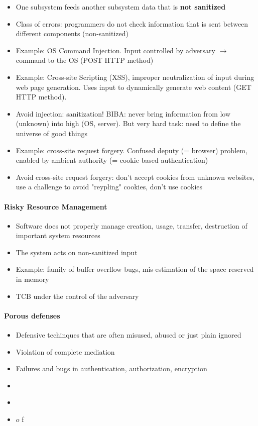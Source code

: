 \documentclass{article}
\newenvironment{myitemize}
{ \begin{itemize}
    \setlength{\itemsep}{005pt}
    \setlength{\parskip}{0pt}
    \setlength{\parsep}{0pt}     }
{ \end{itemize}                  }
\begin{document}
\begin{multicols}{2}
\begin{myitemize}
    \item One subsystem feeds another subsystem data that is \textbf{not sanitized}
    \item Class of errors: programmers do not check information that is sent between different components (non-sanitized)
    \item Example: OS Command Injection. Input controlled by adversary $\rightarrow$ command to the OS (POST HTTP method) 
    \item Example: Cross-site Scripting (XSS), improper neutralization of input during web page generation. Uses input to dynamically generate web content (GET HTTP method). 
    \item Avoid injection: sanitization! BIBA: never bring information from low (unknown) into high (OS, server). But very hard task: need to define the universe of good things
    \item Example: cross-site request forgery. Confused deputy (= browser) problem, enabled by ambient authority (= cookie-based authentication) 
    \item Avoid cross-site request forgery: don't accept cookies from unknown websites, use a challenge to avoid "reypling" cookies, don't use cookies
\end{myitemize}

\paragraph{Risky Resource Management}

\begin{myitemize}
    \item Software does not properly manage creation, usage, transfer, destruction of important system resources
    \item The system acts on non-sanitized input
    \item Example: family of buffer overflow bugs, mis-estimation of the space reserved in memory 
    \item TCB under the control of the adversary
\end{myitemize}

\paragraph{Porous defenses}

\begin{myitemize}
    \item Defensive techinques that are often misused, abused or just plain ignored
    \item Violation of complete mediation
    \item Failures and bugs in authentication, authorization, encryption
    \item 
\end{myitemize}

\begin{myitemize}
    \item 
\end{myitemize}

\begin{myitemize}
     \item[$o$] f
\end{myitemize}


\end{multicols}
\end{document}
